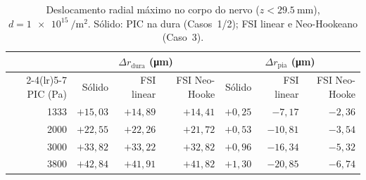 \begin{table}[h!]
\centering
\small
\caption{Deslocamento radial máximo no corpo do nervo ($z < \SI{29.5}{\milli\meter}$), $d = \SI{1e15}{\per\meter\squared}$. Sólido: PIC na dura (Casos~1/2); FSI linear e Neo-Hookeano (Caso~3).}
\label{tab:met-val-estrutural}
\begin{tabular}{r r r r r r r}
\toprule
 &
\multicolumn{3}{c}{$\Delta r_{\mathrm{dura}}$ (\si{\micro\meter})} &
\multicolumn{3}{c}{$\Delta r_{\mathrm{pia}}$ (\si{\micro\meter})} \\
\cmidrule(lr){2-4}\cmidrule(lr){5-7}
PIC (\si{\pascal}) & Sólido & FSI linear & FSI Neo-Hooke & Sólido & FSI linear & FSI Neo-Hooke \\
\midrule
1333 & $+15{,}03$ & $+14{,}89$ & $+14{,}41$ & $+0{,}25$ & $-7{,}17$ & $-2{,}36$ \\
2000 & $+22{,}55$ & $+22{,}26$ & $+21{,}72$ & $+0{,}53$ & $-10{,}81$ & $-3{,}54$ \\
3000 & $+33{,}82$ & $+33{,}22$ & $+32{,}82$ & $+0{,}96$ & $-16{,}34$ & $-5{,}32$ \\
3800 & $+42{,}84$ & $+41{,}91$ & $+41{,}82$ & $+1{,}30$ & $-20{,}85$ & $-6{,}74$ \\
\bottomrule
\end{tabular}
\end{table}
